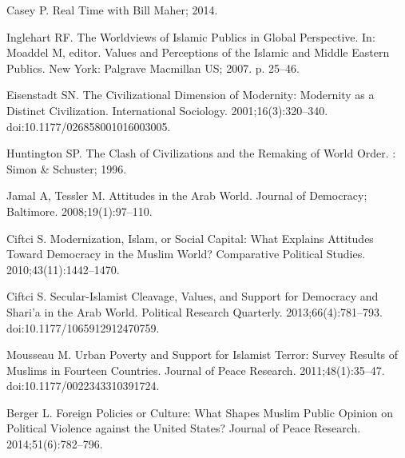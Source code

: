 \documentclass[10pt,letterpaper]{article}
\begin{document}
%
%
% 
\begin{thebibliography}{10}

Casey P. Real {{Time}} with {{Bill Maher}}; 2014.

Inglehart RF.
\newblock The {{Worldviews}} of {{Islamic Publics}} in {{Global Perspective}}.
\newblock In: Moaddel M, editor. Values and {{Perceptions}} of the {{Islamic}}
  and {{Middle Eastern Publics}}. {New York}: {Palgrave Macmillan US}; 2007. p.
  25--46.

Eisenstadt SN.
\newblock The {{Civilizational Dimension}} of {{Modernity}}: {{Modernity}} as a
  {{Distinct Civilization}}.
\newblock International Sociology. 2001;16(3):320--340.
\newblock doi:{10.1177/026858001016003005}.

Huntington SP.
\newblock The {{Clash}} of {{Civilizations}} and the {{Remaking}} of {{World
  Order}}.
: {Simon \& Schuster}; 1996.

Jamal A, Tessler M.
\newblock Attitudes in the {{Arab World}}.
\newblock Journal of Democracy; Baltimore. 2008;19(1):97--110.

Ciftci S.
\newblock Modernization, {{Islam}}, or {{Social Capital}}: {{What Explains
  Attitudes Toward Democracy}} in the {{Muslim World}}?
\newblock Comparative Political Studies. 2010;43(11):1442--1470.

Ciftci S.
\newblock Secular-{{Islamist Cleavage}}, {{Values}}, and {{Support}} for
  {{Democracy}} and {{Shari}}'a in the {{Arab World}}.
\newblock Political Research Quarterly. 2013;66(4):781--793.
\newblock doi:{10.1177/1065912912470759}.

Mousseau M.
\newblock Urban Poverty and Support for {{Islamist}} Terror: {{Survey}} Results
  of {{Muslims}} in Fourteen Countries.
\newblock Journal of Peace Research. 2011;48(1):35--47.
\newblock doi:{10.1177/0022343310391724}.

Berger L.
\newblock Foreign Policies or Culture: {{What}} Shapes {{Muslim}} Public
  Opinion on Political Violence against the {{United States}}?
\newblock Journal of Peace Research. 2014;51(6):782--796.


\end{thebibliography}
\end{document}
